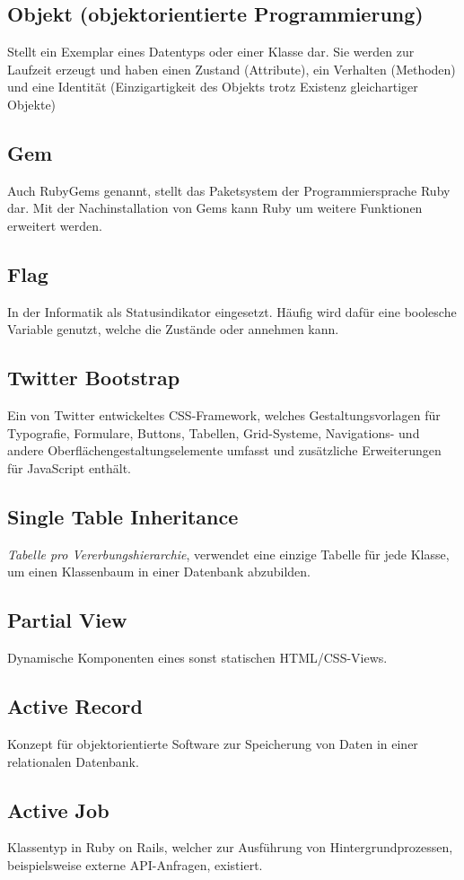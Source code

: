 \subsection*{Objekt (objektorientierte Programmierung)}
Stellt ein Exemplar eines Datentyps oder einer Klasse dar. Sie werden zur Laufzeit erzeugt und haben
einen Zustand (Attribute), ein Verhalten (Methoden) und eine Identität (Einzigartigkeit des Objekts trotz
Existenz gleichartiger Objekte)
\subsection*{Gem}
Auch RubyGems genannt, stellt das Paketsystem der Programmiersprache Ruby dar. Mit der Nachinstallation
von Gems kann Ruby um weitere Funktionen erweitert werden.
\subsection*{Flag}
In der Informatik als Statusindikator eingesetzt. Häufig wird dafür eine boolesche Variable genutzt,
welche die Zustände  oder  annehmen kann.
\subsection*{Twitter Bootstrap}
Ein von Twitter entwickeltes CSS-Framework, welches Gestaltungsvorlagen für
Typografie, Formulare, Buttons, Tabellen, Grid-Systeme, Navigations- und andere
Oberflächengestaltungselemente umfasst und zusätzliche Erweiterungen für JavaScript enthält.
\subsection*{Single Table Inheritance}
\emph{Tabelle pro Vererbungshierarchie}, verwendet eine einzige Tabelle für jede Klasse, um einen
Klassenbaum in einer Datenbank abzubilden.
\subsection*{Partial View}
Dynamische Komponenten eines sonst statischen HTML/CSS-Views.
\subsection*{Active Record}
Konzept für objektorientierte Software zur Speicherung von Daten in einer relationalen
Datenbank.
\subsection*{Active Job}
Klassentyp in Ruby on Rails, welcher zur Ausführung von Hintergrundprozessen, beispielsweise
externe API-Anfragen, existiert.
